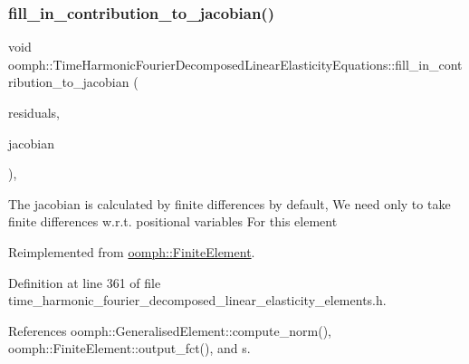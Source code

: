 \subsubsection{\texorpdfstring{fill\+\_\+in\+\_\+contribution\+\_\+to\+\_\+jacobian()}{fill\_in\_contribution\_to\_jacobian()}}
{\footnotesize\ttfamily void oomph\+::\+Time\+Harmonic\+Fourier\+Decomposed\+Linear\+Elasticity\+Equations\+::fill\+\_\+in\+\_\+contribution\+\_\+to\+\_\+jacobian (\begin{DoxyParamCaption}\item[{\hyperlink{classoomph_1_1Vector}{Vector}$<$ double $>$ \&}]{residuals,  }\item[{\hyperlink{classoomph_1_1DenseMatrix}{Dense\+Matrix}$<$ double $>$ \&}]{jacobian }\end{DoxyParamCaption})\hspace{0.3cm}{\ttfamily [inline]}, {\ttfamily [virtual]}}

The jacobian is calculated by finite differences by default, We need only to take finite differences w.\+r.\+t. positional variables For this element 

Reimplemented from \hyperlink{classoomph_1_1FiniteElement_a0ae7af222af38a0d53bf283dc85bdfea}{oomph\+::\+Finite\+Element}.



Definition at line 361 of file time\+\_\+harmonic\+\_\+fourier\+\_\+decomposed\+\_\+linear\+\_\+elasticity\+\_\+elements.\+h.



References oomph\+::\+Generalised\+Element\+::compute\+\_\+norm(), oomph\+::\+Finite\+Element\+::output\+\_\+fct(), and s.

\mbox{\label{classoomph_1_1TimeHarmonicFourierDecomposedLinearElasticityEquations_a38dec4f82df17e0eced052a2aff8aa7c}} 

